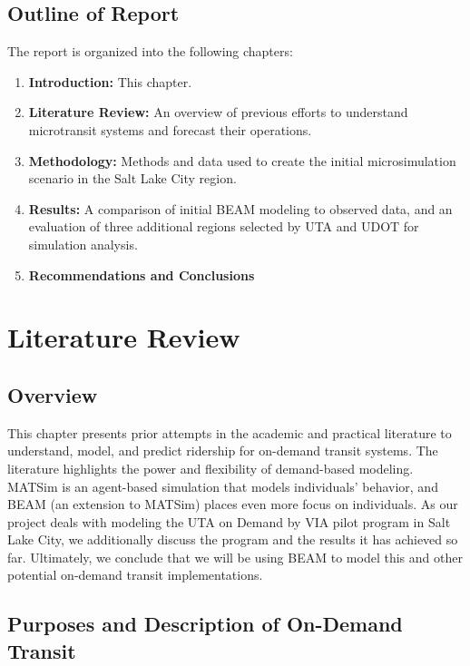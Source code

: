 \documentclass[
]{report}
\providecommand{\tightlist}{%
  \setlength{\itemsep}{0pt}\setlength{\parskip}{0pt}}
\begin{document}
\hypertarget{outline-of-report}{%
\section{Outline of Report}\label{outline-of-report}}

The report is organized into the following chapters:

\begin{enumerate}
\def\labelenumi{\arabic{enumi}.}
\tightlist
\item
  \textbf{Introduction:} This chapter.
\item
  \textbf{Literature Review:} An overview of previous efforts to understand microtransit systems and forecast their operations.
\item
  \textbf{Methodology:} Methods and data used to create the initial microsimulation scenario in the Salt Lake City region.
\item
  \textbf{Results:} A comparison of initial BEAM modeling to observed data, and an evaluation of three additional regions selected by UTA and UDOT for simulation analysis.
\item
  \textbf{Recommendations and Conclusions}
\end{enumerate}

\hypertarget{literature-review}{%
\chapter{Literature Review}\label{literature-review}}

\hypertarget{overview}{%
\section{Overview}\label{overview}}

This chapter presents prior attempts in the academic and practical literature to understand, model, and predict ridership for on-demand transit systems. The literature highlights the power and flexibility of demand-based modeling. MATSim is an agent-based simulation that models individuals' behavior, and BEAM (an extension to MATSim) places even more focus on individuals. As our project deals with modeling the UTA on Demand by VIA pilot program in Salt Lake City, we additionally discuss the program and the results it has achieved so far. Ultimately, we conclude that we will be using BEAM to model this and other potential on-demand transit implementations.

\hypertarget{purposes-and-description-of-on-demand-transit}{%
\section{Purposes and Description of On-Demand Transit}\label{purposes-and-description-of-on-demand-transit}}
\end{document}
